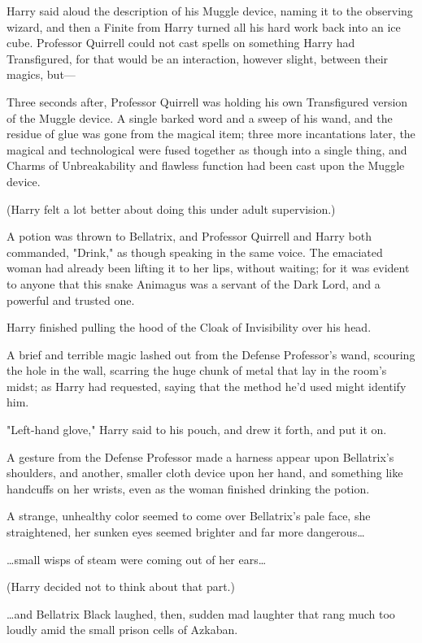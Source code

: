 Harry said aloud the description of his Muggle device, naming it to the 
observing wizard, and then a Finite from Harry turned all his hard work back 
into an ice cube. Professor Quirrell could not cast spells on something Harry 
had Transfigured, for that would be an interaction, however slight, between 
their magics, but---

Three seconds after, Professor Quirrell was holding his own Transfigured 
version of the Muggle device. A single barked word and a sweep of his wand, and 
the residue of glue was gone from the magical item; three more incantations 
later, the magical and technological were fused together as though into a 
single thing, and Charms of Unbreakability and flawless function had been cast 
upon the Muggle device.

(Harry felt a lot better about doing this under adult supervision.)

A potion was thrown to Bellatrix, and Professor Quirrell and Harry both 
commanded, "Drink," as though speaking in the same voice. The emaciated woman 
had already been lifting it to her lips, without waiting; for it was evident to 
anyone that this snake Animagus was a servant of the Dark Lord, and a powerful 
and trusted one.

Harry finished pulling the hood of the Cloak of Invisibility over his head.

A brief and terrible magic lashed out from the Defense Professor's wand, 
scouring the hole in the wall, scarring the huge chunk of metal that lay in the 
room's midst; as Harry had requested, saying that the method he'd used might 
identify him.

"Left-hand glove," Harry said to his pouch, and drew it forth, and put it on.

A gesture from the Defense Professor made a harness appear upon Bellatrix's 
shoulders, and another, smaller cloth device upon her hand, and something like 
handcuffs on her wrists, even as the woman finished drinking the potion.

A strange, unhealthy color seemed to come over Bellatrix's pale face, she 
straightened, her sunken eyes seemed brighter and far more dangerous{\ldots}

{\ldots}small wisps of steam were coming out of her ears{\ldots}

(Harry decided not to think about that part.)

{\ldots}and Bellatrix Black laughed, then, sudden mad laughter that rang much 
too loudly amid the small prison cells of Azkaban.

